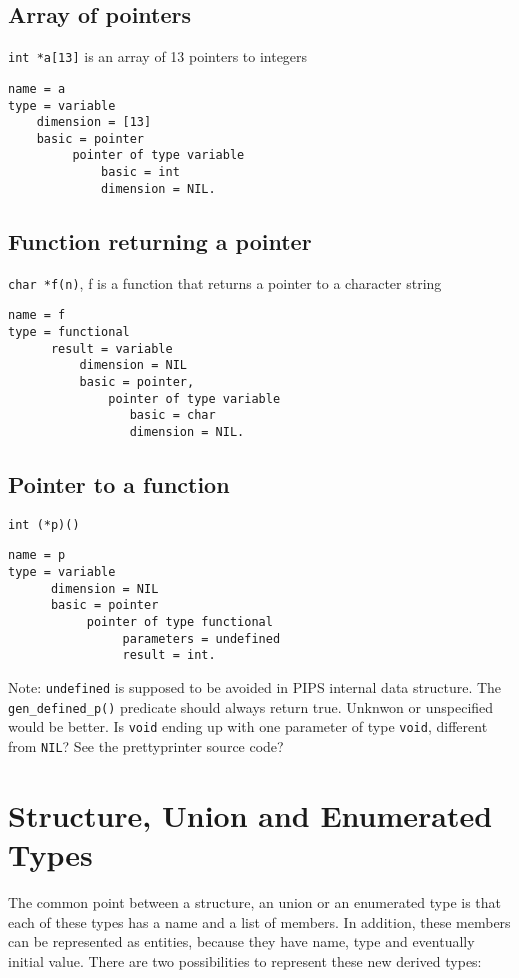 \documentclass[a4paper]{report}
\begin{document}
\subsection{Array of pointers}

\lstinline/int *a[13]/ is an array of 13 pointers to integers
\begin{verbatim}
name = a
type = variable
    dimension = [13]
    basic = pointer
         pointer of type variable
             basic = int
             dimension = NIL.
\end{verbatim}

\subsection{Function returning a pointer}

\lstinline/char *f(n)/, f is a function that returns a pointer to a character
string
\begin{verbatim}
name = f
type = functional 
      result = variable
          dimension = NIL
          basic = pointer,
              pointer of type variable
                 basic = char
                 dimension = NIL. 
\end{verbatim}

\subsection{Pointer to a function}

\lstinline/int (*p)()/
\begin{verbatim}
name = p
type = variable
      dimension = NIL
      basic = pointer
           pointer of type functional
                parameters = undefined
                result = int.
\end{verbatim}

Note: \lstinline/undefined/ is supposed to be avoided in PIPS internal
 data structure. The \lstinline/gen_defined_p()/ predicate should
 always return true. Unknwon or unspecified would be better. Is
 \lstinline/void/ ending up with one parameter of type
 \lstinline{void}, different from \lstinline/NIL/? See the
 prettyprinter source code?

\section{Structure, Union and Enumerated Types} 

The common point between a structure, an union or an enumerated type
 is that each of these types has a name and a list of members. In
 addition, these members can be represented as entities, because they
 have name, type and eventually initial value. There are two
 possibilities to represent these new derived types:
\end{document}
